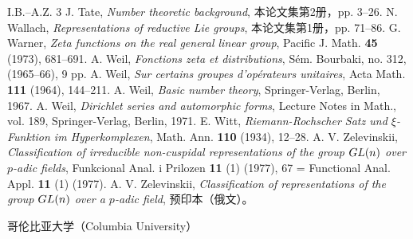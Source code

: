 \begin{thebibliography}{I.B.--A.Z. 3}
 J. Tate, \emph{Number theoretic background}, 本论文集第2册，pp. 3--26.
 N. Wallach, \emph{Representations of reductive Lie groups}, 本论文集第1册，pp. 71--86.
 G. Warner, \emph{Zeta functions on the real general linear group}, Pacific J. Math. \textbf{45} (1973), 681--691.
 A. Weil, \emph{Fonctions zeta et distributions}, Sém. Bourbaki, no. 312, (1965--66), 9 pp.
 A. Weil, \emph{Sur certains groupes d'opérateurs unitaires}, Acta Math. \textbf{111} (1964), 144--211.
 A. Weil, \emph{Basic number theory}, Springer-Verlag, Berlin, 1967.
 A. Weil, \emph{Dirichlet series and automorphic forms}, Lecture Notes in Math., vol. 189, Springer-Verlag, Berlin, 1971.
 E. Witt, \emph{Riemann-Rochscher Satz und $\xi$-Funktion im Hyperkomplexen}, Math. Ann. \textbf{110} (1934), 12--28.
 A. V. Zelevinskii, \emph{Classification of irreducible non-cuspidal representations of the group $GL(n)$ over $p$-adic fields}, Funkcional Anal. i Prilozen \textbf{11} (1) (1977), 67 = Functional Anal. Appl. \textbf{11} (1) (1977).
 A. V. Zelevinskii, \emph{Classification of representations of the group $GL(n)$ over a $p$-adic field}, 预印本（俄文）。
\end{thebibliography}

\begin{flushright}
哥伦比亚大学（Columbia University）
\end{flushright}
